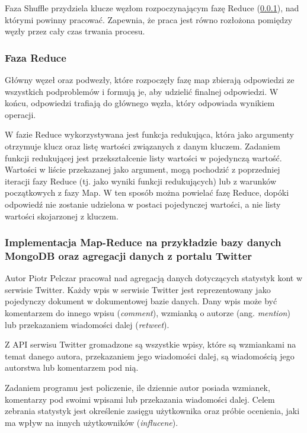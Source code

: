 Faza Shuffle przydziela klucze  węzłom rozpoczynającym fazę Reduce (\ref{sec:mapreduce-reduce}), nad którymi powinny 
pracować. Zapewnia, że praca jest równo rozłożona pomiędzy węzły przez cały czas trwania procesu.

\subsubsection{Faza Reduce}
\label{sec:mapreduce-reduce}

Główny węzeł oraz podwezły, które rozpoczęły fazę map zbierają odpowiedzi ze wszystkich podproblemów i formują je, aby udzielić finalnej odpowiedzi. W końcu, odpowiedzi trafiają do głównego węzła, który odpowiada wynikiem operacji.

W fazie Reduce wykorzystywana jest funkcja redukująca, która jako argumenty otrzymuje klucz oraz listę wartości związanych z danym kluczem. Zadaniem funkcji redukującej jest przekształcenie listy wartości w pojedynczą wartość. Wartości w liście przekazanej jako argument, mogą pochodzić z poprzedniej iteracji fazy Reduce (tj. jako wyniki funkcji redukujących) lub z warunków początkowych z fazy Map. W ten sposób można powielać fazę Reduce, dopóki odpowiedź nie zostanie udzielona w postaci pojedynczej wartości, a nie listy wartości skojarzonej z kluczem.

\subsubsection{Implementacja Map-Reduce na przykładzie bazy danych MongoDB oraz agregacji danych z portalu Twitter}
\label{sec:mapreduce-implementation-twitter}

Autor Piotr Pelczar pracował nad agregacją danych dotyczących statystyk kont w serwisie Twitter. Każdy wpis w serwisie Twitter jest reprezentowany jako pojedynczy dokument w dokumentowej bazie danych. Dany wpis może być komentarzem  do innego wpisu (\emph{comment}), wzmianką o autorze (ang. \emph{mention}) lub przekazaniem wiadomości dalej (\emph{retweet}).

Z API serwisu Twitter gromadzone są wszystkie wpisy, które są wzmiankami na temat danego autora, przekazaniem jego wiadomości dalej, są wiadomością jego autorstwa lub komentarzem pod nią.

Zadaniem programu jest policzenie, ile dziennie autor posiada wzmianek, komentarzy pod swoimi wpisami lub przekazania wiadomości dalej. Celem zebrania statystyk jest określenie zasięgu użytkownika oraz próbie ocenienia, jaki ma wpływ na innych użytkowników (\emph{influcene}).

